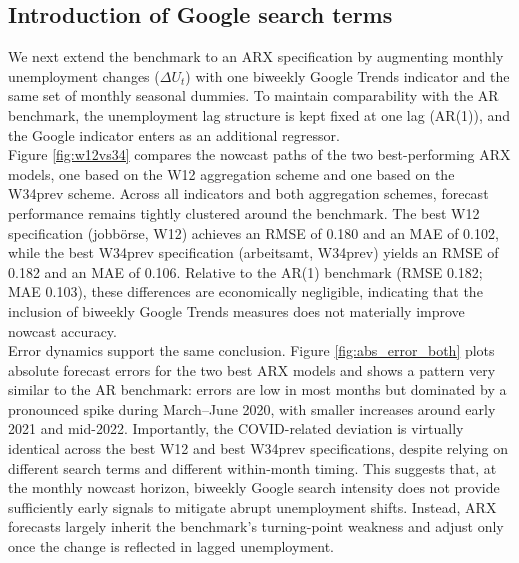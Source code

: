 \documentclass[12pt,a4paper]{article}
\begin{document}
\subsection{Introduction of Google search terms}
We next extend the benchmark to an ARX specification by augmenting monthly unemployment changes ($\Delta U_t$) with one biweekly Google Trends indicator and the same set of monthly seasonal dummies. To maintain comparability with the AR benchmark, the unemployment lag structure is kept fixed at one lag (AR(1)), and the Google indicator enters as an additional regressor.\\
Figure \ref{fig:w12vs34} compares the nowcast paths of the two best-performing ARX models, one based on the W12 aggregation scheme and one based on the W34prev scheme. Across all indicators and both aggregation schemes, forecast performance remains tightly clustered around the benchmark. The best W12 specification (jobbörse, W12) achieves an RMSE of 0.180 and an MAE of 0.102, while the best W34prev specification (arbeitsamt, W34prev) yields an RMSE of 0.182 and an MAE of 0.106. Relative to the AR(1) benchmark (RMSE 0.182; MAE 0.103), these differences are economically negligible, indicating that the inclusion of biweekly Google Trends measures does not materially improve nowcast accuracy.\\
Error dynamics support the same conclusion. Figure \ref{fig:abs_error_both} plots absolute forecast errors for the two best ARX models and shows a pattern very similar to the AR benchmark: errors are low in most months but dominated by a pronounced spike during March--June 2020, with smaller increases around early 2021 and mid-2022. Importantly, the COVID-related deviation is virtually identical across the best W12 and best W34prev specifications, despite relying on different search terms and different within-month timing. This suggests that, at the monthly nowcast horizon, biweekly Google search intensity does not provide sufficiently early signals to mitigate abrupt unemployment shifts. Instead, ARX forecasts largely inherit the benchmark’s turning-point weakness and adjust only once the change is reflected in lagged unemployment.
\end{document}
